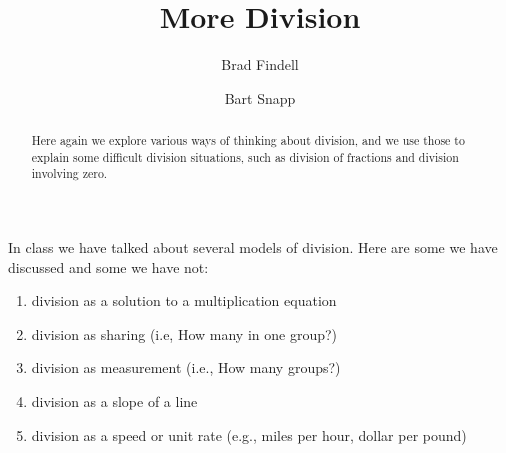 \documentclass{ximera}
\title{More Division}
\author{Brad Findell \and Bart Snapp}
\begin{document}
\begin{abstract}
Here again we explore various ways of thinking about division, and we use those to explain some difficult division situations, such as division of fractions and division involving zero.
\end{abstract}
\maketitle


%
%
%


In class we have talked about several models of division.  Here are some we have discussed and some we have not:   
\begin{enumerate}
\item division as a solution to a multiplication equation
\item division as sharing (i.e, How many in one group?)
\item division as measurement (i.e., How many groups?)
\item division as a slope of a line
\item division as a speed or unit rate (e.g., miles per hour, dollar per pound) 
\end{enumerate}
\end{document}
